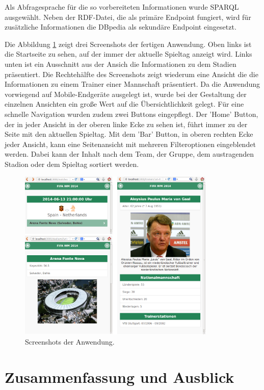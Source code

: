 \documentclass[runningheads,a4paper]{llncs}
\begin{document}
Als Abfragesprache für die so vorbereiteten Informationen wurde SPARQL ausgewählt. Neben der RDF-Datei, die als primäre Endpoint fungiert, wird für zusätzliche Informationen die DBpedia als sekundäre Endpoint eingesetzt. 

\newpage
Die Abbildung \ref{fig:screenshots} zeigt drei Screenshots der fertigen Anwendung. Oben links ist die Startseite zu sehen, auf der immer der aktuelle Spieltag anzeigt wird. Links unten ist ein Ausschnitt aus der Ansich die Informationen zu dem Stadien präsentiert. Die Rechtehälfte des Screenshots zeigt wiederum eine Ansicht die die Informationen zu einem Trainer einer Mannschaft präsentiert. Da die Anwendung vorwiegend auf Mobile-Endgeräte ausgelegt ist, wurde bei der Gestaltung der einzelnen Ansichten ein große Wert auf die Übersichtlichkeit gelegt. Für eine schnelle Navigation wurden zudem zwei Buttons eingepflegt. Der 'Home' Button, der in jeder Ansicht in der oberen linke Ecke zu sehen ist, führt immer zu der Seite mit den aktuellen Spieltag. Mit dem 'Bar' Button, in oberen rechten Ecke jeder Ansicht, kann eine Seitenansicht mit mehreren Filteroptionen eingeblendet werden. Dabei kann der Inhalt nach dem Team, der Gruppe, dem austragenden Stadion oder dem Spieltag sortiert werden.

       
\begin{figure}
\centering
\includegraphics[height=8.2cm]{screenshots}
\caption{Screenshots der Anwendung.}
\label{fig:screenshots}
\end{figure}

\newpage

\section{Zusammenfassung und Ausblick}
\end{document}
